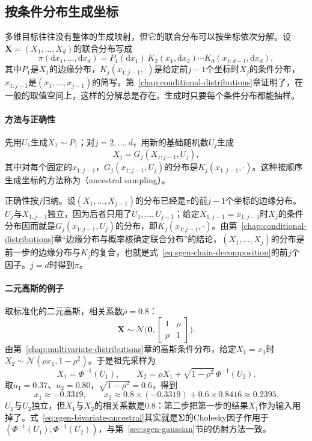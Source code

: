 \subsection{按条件分布生成坐标}
\label{sec:sgen-ancestral}

多维目标往往没有整体的生成映射，但它的联合分布可以按坐标依次分解。设$\bm{X}=(X_1,\dots,X_d)$的联合分布写成
\begin{equation}
  \pi(\mathrm{d}x_1,\dots,\mathrm{d}x_d)=P_1(\mathrm{d}x_1)\,K_2(x_1,\mathrm{d}x_2)\cdots K_d(x_{1:d-1},\mathrm{d}x_d),
  \label{eq:sgen-chain-decomposition}
\end{equation}
其中$P_1$是$X_1$的边缘分布，$K_j(x_{1:j-1},\cdot)$是给定前$j-1$个坐标时$X_j$的条件分布，$x_{1:j-1}$是$(x_1,\dots,x_{j-1})$的简写。第~\ref{chap:conditional-distributions}章证明了，在一般的取值空间上，这样的分解总是存在。生成时只要每个条件分布都能抽样。

\paragraph{方法与正确性}
先用$U_1$生成$X_1\sim P_1$；对$j=2,\dots,d$，用新的基础随机数$U_j$生成
\[
  X_j=G_j(X_{1:j-1},U_j),
\]
其中对每个固定的$x_{1:j-1}$，$G_j(x_{1:j-1},U_j)$的分布是$K_j(x_{1:j-1},\cdot)$。这种按顺序生成坐标的方法称为（ancestral sampling）。

正确性按$j$归纳。设$(X_1,\dots,X_{j-1})$的分布已经是$\pi$的前$j-1$个坐标的边缘分布。$U_j$与$X_{1:j-1}$独立，因为后者只用了$U_1,\dots,U_{j-1}$；给定$X_{1:j-1}=x_{1:j-1}$时$X_j$的条件分布因而就是$G_j(x_{1:j-1},U_j)$的分布，即$K_j(x_{1:j-1},\cdot)$。由第~\ref{chap:conditional-distributions}章“边缘分布与概率核确定联合分布”的结论，$(X_1,\dots,X_j)$的分布是前一步的边缘分布与$K_j$的复合，也就是式~\eqref{eq:sgen-chain-decomposition}的前$j$个因子。$j=d$时得到$\pi$。

\paragraph{二元高斯的例子}
取标准化的二元高斯，相关系数$\rho=0.8$：
\[
  \bm{X}\sim\mathcal{N}\Biggl(\bm{0},\begin{bmatrix}1&\rho\\\rho&1\end{bmatrix}\Biggr).
\]
由第~\ref{chap:multivariate-distributions}章的高斯条件分布，给定$X_1=x_1$时$X_2\sim\mathcal{N}(\rho x_1,1-\rho^{2})$。于是祖先采样为
\begin{equation}
  X_1=\Phi^{-1}(U_1),\qquad X_2=\rho X_1+\sqrt{1-\rho^{2}}\,\Phi^{-1}(U_2).
  \label{eq:sgen-bivariate-ancestral}
\end{equation}
取$u_1=0.37$、$u_2=0.80$，$\sqrt{1-\rho^{2}}=0.6$，得到
\[
  x_1\approx-0.3319,\qquad x_2\approx0.8\times(-0.3319)+0.6\times0.8416\approx0.2395 .
\]
$U_1$与$U_2$独立，但$X_1$与$X_2$的相关系数是$0.8$：第二步把第一步的结果$X_1$作为输入用掉了。式~\eqref{eq:sgen-bivariate-ancestral}其实就是$\bm{\Sigma}$的Cholesky因子作用于$(\Phi^{-1}(U_1),\Phi^{-1}(U_2))$，与第~\ref{sec:sgen-gaussian}节的仿射方法一致。

